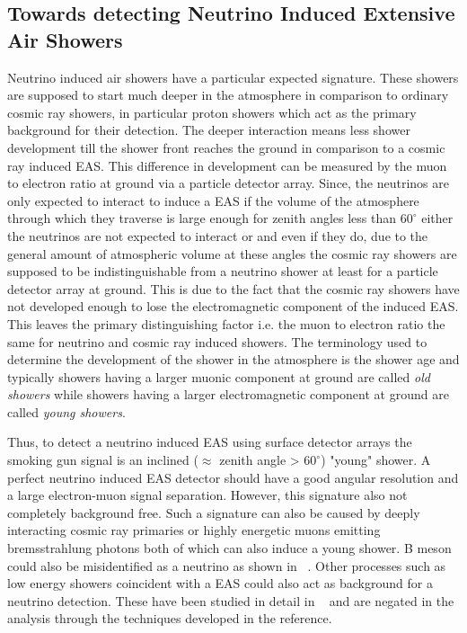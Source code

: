 \subsection*{Towards detecting Neutrino Induced Extensive Air Showers}
Neutrino induced air showers have a particular expected signature. These showers are supposed to start much deeper in the atmosphere in comparison to ordinary cosmic ray showers, in particular proton showers which act as the primary background for their detection. The deeper interaction means less shower development till the shower front reaches the ground in comparison to a cosmic ray induced EAS. This difference in development can be measured by the muon to electron ratio at ground via a particle detector array. Since, the neutrinos are only expected to interact to induce a EAS if the volume of the atmosphere through which they traverse is large enough for zenith angles less than $60^{\circ}$ either the neutrinos are not expected to interact or and even if they do, due to the general amount of atmospheric volume at these angles the cosmic ray showers are supposed to be indistinguishable from a neutrino shower at least for a particle detector array at ground. This is due to the fact that the cosmic ray showers have not developed enough to lose the electromagnetic component of the induced EAS. This leaves the primary distinguishing factor i.e. the muon to electron ratio the same for neutrino and cosmic ray induced showers. The terminology used to determine the development of the shower in the atmosphere is the shower age and typically showers having a larger muonic component at ground are called \textit{old showers} while showers having a larger electromagnetic component at ground are called \textit{young showers}. 

Thus, to detect a neutrino induced EAS using surface detector arrays the smoking gun signal is an inclined ($\approx$ zenith angle > $60^{\circ}$) "young" shower. A perfect neutrino induced EAS detector should have a good angular resolution and a large electron-muon signal separation. However, this signature also not completely background free. Such a signature can also be caused by deeply interacting cosmic ray primaries or highly energetic muons emitting bremsstrahlung photons both of which can also induce a young shower. B meson could also be misidentified as a neutrino as shown in ~\cite{}. Other processes such as low energy showers coincident with a EAS could also act as background for a neutrino detection. These have been studied in detail in ~\cite{} and are negated in the analysis through the techniques developed in the reference. 